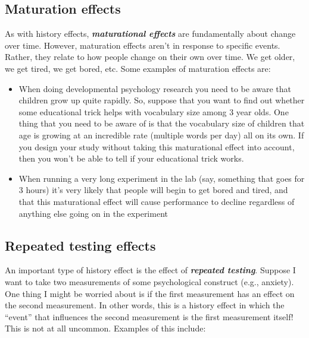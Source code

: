 \documentclass[
]{book}
\providecommand{\tightlist}{%
  \setlength{\itemsep}{0pt}\setlength{\parskip}{0pt}}
\begin{document}
\hypertarget{maturation-effects}{%
\subsection{Maturation effects}\label{maturation-effects}}

As with history effects, \textbf{\emph{maturational effects}} are fundamentally about change over time. However, maturation effects aren't in response to specific events. Rather, they relate to how people change on their own over time. We get older, we get tired, we get bored, etc. Some examples of maturation effects are:

\begin{itemize}
\tightlist
\item
  When doing developmental psychology research you need to be aware that children grow up quite rapidly. So, suppose that you want to find out whether some educational trick helps with vocabulary size among 3 year olds. One thing that you need to be aware of is that the vocabulary size of children that age is growing at an incredible rate (multiple words per day) all on its own. If you design your study without taking this maturational effect into account, then you won't be able to tell if your educational trick works.
\item
  When running a very long experiment in the lab (say, something that goes for 3 hours) it's very likely that people will begin to get bored and tired, and that this maturational effect will cause performance to decline regardless of anything else going on in the experiment
\end{itemize}

\hypertarget{repeated-testing-effects}{%
\subsection{Repeated testing effects}\label{repeated-testing-effects}}

An important type of history effect is the effect of \textbf{\emph{repeated testing}}. Suppose I want to take two measurements of some psychological construct (e.g., anxiety). One thing I might be worried about is if the first measurement has an effect on the second measurement. In other words, this is a history effect in which the ``event'' that influences the second measurement is the first measurement itself! This is not at all uncommon. Examples of this include:
\end{document}
